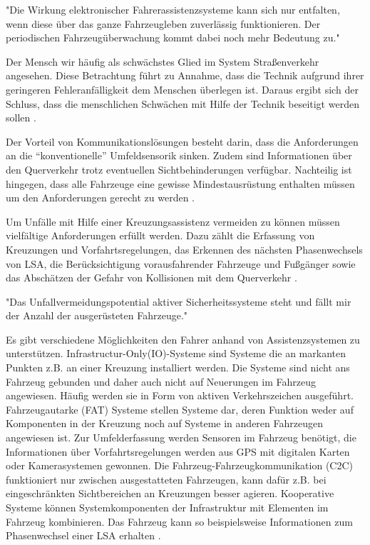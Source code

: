 "Die Wirkung elektronischer Fahrerassistenzsysteme kann sich nur entfalten, wenn diese über das ganze Fahrzeugleben zuverlässig funktionieren. Der periodischen Fahrzeugüberwachung kommt dabei noch mehr Bedeutung zu." \parencite[S.62]{DEKRA.2017}

Der Mensch wir häufig als schwächstes Glied im System Straßenverkehr angesehen. Diese Betrachtung führt zu Annahme, dass die Technik aufgrund ihrer geringeren Fehleranfälligkeit dem Menschen überlegen ist. Daraus ergibt sich der Schluss, dass die menschlichen Schwächen mit Hilfe der Technik beseitigt werden sollen \parencite[S.270]{Burg.2017}.

Der Vorteil von Kommunikationslösungen besteht darin, dass die Anforderungen an die \enquote{konventionelle} Umfeldsensorik sinken. Zudem sind Informationen über den Querverkehr trotz eventuellen Sichtbehinderungen verfügbar. Nachteilig ist hingegen, dass alle Fahrzeuge eine gewisse Mindestausrüstung enthalten müssen um den Anforderungen gerecht zu werden \parencite[S.2]{Mages.2008}.

Um Unfälle mit Hilfe einer Kreuzungsassistenz vermeiden zu können müssen vielfältige Anforderungen erfüllt werden. Dazu zählt die Erfassung von Kreuzungen und Vorfahrtsregelungen, das Erkennen des nächsten Phasenwechsels von LSA, die Berücksichtigung vorausfahrender Fahrzeuge und Fußgänger sowie das Abschätzen der Gefahr von Kollisionen mit dem Querverkehr \parencite[S.9]{Mages.2008}.

"Das Unfallvermeidungspotential aktiver Sicherheitssysteme steht und fällt mir der Anzahl der ausgerüsteten Fahrzeuge." \parencite[S.9]{Mages.2008}

Es gibt verschiedene Möglichkeiten den Fahrer anhand von Assistenzsystemen zu unterstützen. Infrastructur-Only(IO)-Systeme sind Systeme die an markanten Punkten z.B. an einer Kreuzung installiert werden. Die Systeme sind nicht ans Fahrzeug gebunden und daher auch nicht auf Neuerungen im  Fahrzeug angewiesen. Häufig werden sie in Form von aktiven Verkehrszeichen ausgeführt. Fahrzeugautarke (FAT) Systeme stellen Systeme dar, deren Funktion weder auf Komponenten in der Kreuzung noch auf Systeme in anderen Fahrzeugen angewiesen ist. Zur Umfelderfassung werden Sensoren im Fahrzeug benötigt, die Informationen über Vorfahrtsregelungen werden aus GPS mit digitalen Karten oder Kamerasystemen gewonnen. Die Fahrzeug-Fahrzeugkommunikation (C2C) funktioniert nur zwischen ausgestatteten Fahrzeugen, kann dafür z.B. bei eingeschränkten Sichtbereichen an Kreuzungen besser agieren. Kooperative Systeme können Systemkomponenten der Infrastruktur mit Elementen im Fahrzeug kombinieren. Das Fahrzeug kann so beispielsweise Informationen zum Phasenwechsel einer LSA erhalten \parencite[S.23-26]{Mages.2008}.

